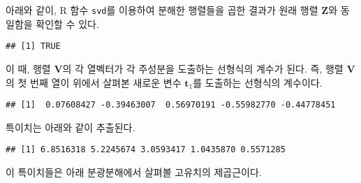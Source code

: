 \documentclass[]{book}
\newenvironment{Shaded}{\begin{snugshade}}{\end{snugshade}}
\newcommand{\DecValTok}[1]{\textcolor[rgb]{0.00,0.00,0.81}{#1}}
\newcommand{\KeywordTok}[1]{\textcolor[rgb]{0.13,0.29,0.53}{\textbf{#1}}}
\newcommand{\NormalTok}[1]{#1}
\newcommand{\OperatorTok}[1]{\textcolor[rgb]{0.81,0.36,0.00}{\textbf{#1}}}
\newcommand{\StringTok}[1]{\textcolor[rgb]{0.31,0.60,0.02}{#1}}
\begin{document}
아래와 같이, R 함수 \texttt{svd}를 이용하여 분해한 행렬들을 곱한 결과가 원래 행렬 \(\mathbf{Z}\)와 동일함을 확인할 수 있다.

\begin{Shaded}
\end{Shaded}

\begin{verbatim}
## [1] TRUE
\end{verbatim}

이 때, 행렬 \(\mathbf{V}\)의 각 열벡터가 각 주성분을 도출하는 선형식의 계수가 된다. 즉, 행렬 \(\mathbf{V}\)의 첫 번째 열이 위에서 살펴본 새로운 변수 \(\mathbf{t}_1\)를 도출하는 선형식의 계수이다.

\begin{Shaded}
\end{Shaded}

\begin{verbatim}
## [1]  0.07608427 -0.39463007  0.56970191 -0.55982770 -0.44778451
\end{verbatim}

특이치는 아래와 같이 추출된다.

\begin{Shaded}
\end{Shaded}

\begin{verbatim}
## [1] 6.8516318 5.2245674 3.0593417 1.0435870 0.5571285
\end{verbatim}

이 특이치들은 아래 분광분해에서 살펴볼 고유치의 제곱근이다.
\end{document}
